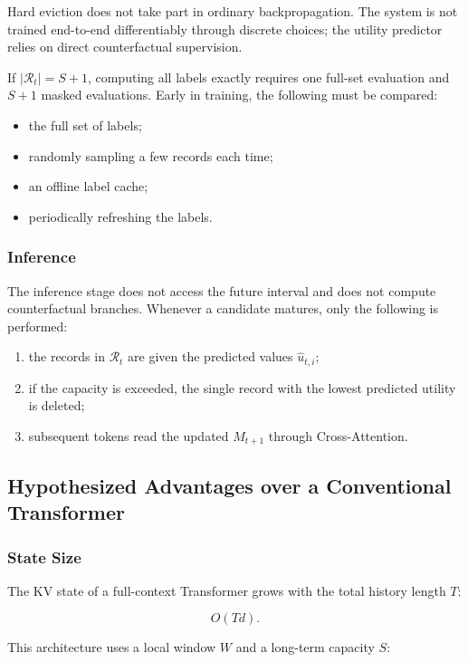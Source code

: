 Hard eviction does not take part in ordinary backpropagation. The system is not trained end-to-end differentiably through discrete choices; the utility predictor relies on direct counterfactual supervision.

If $|\mathcal R_t|=S+1$, computing all labels exactly requires one full-set evaluation and $S+1$ masked evaluations. Early in training, the following must be compared:

\begin{itemize}
  \item the full set of labels;
  \item randomly sampling a few records each time;
  \item an offline label cache;
  \item periodically refreshing the labels.
\end{itemize}

\subsubsection{Inference}

The inference stage does not access the future interval and does not compute counterfactual branches. Whenever a candidate matures, only the following is performed:

\begin{enumerate}
  \item the records in $\mathcal R_t$ are given the predicted values $\hat u_{t,i}$;
  \item if the capacity is exceeded, the single record with the lowest predicted utility is deleted;
  \item subsequent tokens read the updated $M_{t+1}$ through Cross-Attention.
\end{enumerate}

\subsection{Hypothesized Advantages over a Conventional Transformer}

\subsubsection{State Size}

The KV state of a full-context Transformer grows with the total history length $T$:

\[
O(Td).
\]

This architecture uses a local window $W$ and a long-term capacity $S$:

